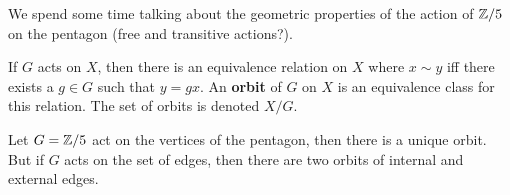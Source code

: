 We spend some time talking about the geometric properties of the action of $\mathbb{Z} /5$ on the pentagon (free and transitive actions?).
\begin{definition}[]
    If $G$ acts on $X$, then there is an equivalence relation on $X$ where $x\sim y $ iff there exists a $g \in G$ such that $y=gx$. An \textbf{orbit}  of $G$ on $X$ is an equivalence class for this relation. The set of orbits is denoted $X /G$.
\end{definition}
\begin{example}
    Let $G= \mathbb{Z}/5$ act on the vertices of the pentagon, then there is a unique orbit. But if $G $ acts on the set of edges, then there are two orbits of internal and external edges.
\end{example}
